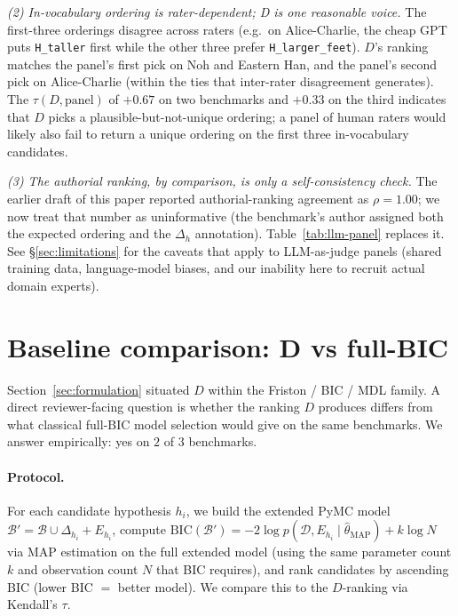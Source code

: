 \documentclass{article}
\begin{document}
\emph{(2) In-vocabulary ordering is rater-dependent; D is one
reasonable voice.} The first-three orderings disagree across raters
(e.g.\ on Alice-Charlie, the cheap GPT puts \texttt{H\_taller} first
while the other three prefer \texttt{H\_larger\_feet}). $D$'s
ranking matches the panel's first pick on Noh and Eastern Han, and
the panel's second pick on Alice-Charlie (within the ties that
inter-rater disagreement generates). The $\tau(D, \text{panel})$ of
$+0.67$ on two benchmarks and $+0.33$ on the third indicates that
$D$ picks a plausible-but-not-unique ordering; a panel of human
raters would likely also fail to return a unique ordering on
the first three in-vocabulary candidates.

\emph{(3) The authorial ranking, by comparison, is only a
self-consistency check.} The earlier draft of this paper reported
authorial-ranking agreement as $\rho = 1.00$; we now treat that number
as uninformative (the benchmark's author assigned both the expected
ordering and the $\Delta_{h}$ annotation). Table~\ref{tab:llm-panel}
replaces it. See \S\ref{sec:limitations} for the caveats that apply
to LLM-as-judge panels (shared training data, language-model biases,
and our inability here to recruit actual domain experts).

\section{Baseline comparison: D vs full-BIC}
\label{sec:baselines}

Section~\ref{sec:formulation} situated $D$ within the Friston / BIC
/ MDL family. A direct reviewer-facing question is whether the
ranking $D$ produces differs from what classical full-BIC model
selection would give on the same benchmarks. We answer empirically:
yes on $2$ of $3$ benchmarks.

\paragraph{Protocol.} For each candidate hypothesis $h_{i}$, we build
the extended PyMC model $\mathcal{B}' = \mathcal{B} \cup \Delta_{h_{i}} +
E_{h_{i}}$, compute $\mathrm{BIC}(\mathcal{B}') = -2 \log p(\mathcal{D},
E_{h_{i}} \mid \hat{\theta}_{\mathrm{MAP}}) + k \log N$ via MAP
estimation on the full extended model (using the same parameter count
$k$ and observation count $N$ that BIC requires), and rank candidates
by ascending BIC (lower BIC $=$ better model). We compare this to the
$D$-ranking via Kendall's $\tau$.
\end{document}
